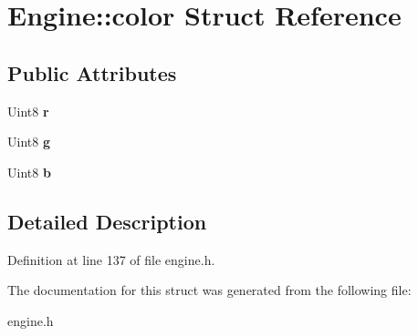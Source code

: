 \hypertarget{structEngine_1_1color}{}\section{Engine\+:\+:color Struct Reference}
\label{structEngine_1_1color}
\subsection*{Public Attributes}
\begin{DoxyCompactItemize}
\item 
Uint8 {\bfseries r}\hypertarget{structEngine_1_1color_ad2f4cb4cb1d9b251100bd1a4ebfa6b1e}{}\label{structEngine_1_1color_ad2f4cb4cb1d9b251100bd1a4ebfa6b1e}

\item 
Uint8 {\bfseries g}\hypertarget{structEngine_1_1color_a3e4b52509fd71e8551d297cd87073af4}{}\label{structEngine_1_1color_a3e4b52509fd71e8551d297cd87073af4}

\item 
Uint8 {\bfseries b}\hypertarget{structEngine_1_1color_a2c684bfdca0608a79500f714671b97e9}{}\label{structEngine_1_1color_a2c684bfdca0608a79500f714671b97e9}

\end{DoxyCompactItemize}


\subsection{Detailed Description}


Definition at line 137 of file engine.\+h.



The documentation for this struct was generated from the following file\+:\begin{DoxyCompactItemize}
\item 
engine.\+h\end{DoxyCompactItemize}
